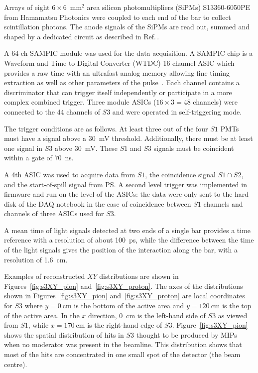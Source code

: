 Arrays of eight $6 \times 6$~mm$^2$ area silicon photomultipliers (SiPMs) S13360-6050PE from Hamamatsu Photonics \cite{Hamamatsu} were coupled to each end of the bar to collect scintillation photons.
The anode signals of the SiPMs are read out, summed and shaped by a dedicated circuit as described in Ref.\,\cite{S3-readout}.

A 64-ch SAMPIC  module was used for the data acquisition.
A SAMPIC chip is a Waveform and Time to Digital Converter (WTDC) 16-channel ASIC which provides a raw time with an ultrafast analog memory allowing fine timing extraction as well as other parameters of the pulse~\cite{SAMPIC}.
Each channel contains a discriminator that can trigger itself independently or participate in a more complex combined trigger. 
Three module ASICs ($16\times3=48$ channels) were connected to the 44 channels of $\mathit{S3}$ and were operated in self-triggering mode.

The trigger conditions are as follows. At least three out of the four $\mathit{S1}$ PMTs must have a signal above a 30~mV threshold.
Additionally, there must be at least one signal in $\mathit{S3}$ above 30~mV.
These $\mathit{S1}$ and $\mathit{S3}$ signals must be coincident within a gate of 70~ns.

A 4th ASIC was used to acquire data from $\mathit{S1}$, the coincidence signal $\mathit{S1} \cap \mathit{S2}$, and the start-of-spill signal from PS.
A second level trigger was implemented in firmware and run on the level of the ASICs: the data were only sent to the hard disk of the DAQ notebook in the case of coincidence between $\mathit{S1}$ channels and channels of three ASICs used for $\mathit{S3}$.

A mean time of light signals detected at two ends of a single bar provides a time reference with a resolution of about 100~ps, while the difference between the time of the light signals gives the position of the interaction along the bar, with a resolution of 1.6~cm.

Examples of reconstructed $XY$ distributions are shown in Figures~\ref{fig:s3XY_pion} and~\ref{fig:s3XY_proton}.
The axes of the distributions shown in Figures~\ref{fig:s3XY_pion} and~\ref{fig:s3XY_proton} are local coordinates for $\mathit{S3}$ where $y=0~\text{cm}$ is the bottom of the active area and $y=120~\text{cm}$ is the top of the active area.
In the $x$ direction, 0~cm is the left-hand side of $\mathit{S3}$ as viewed from $\mathit{S1}$, while $x = 170~\text{cm}$ is the right-hand edge of $\mathit{S3}$.
Figure~\ref{fig:s3XY_pion} shows the spatial distribution of hits in $\mathit{S3}$ thought to be produced by MIPs when no moderator was present in the beamline.
This distribution shows that most of the hits are concentrated in one small spot of the detector (the beam centre).

